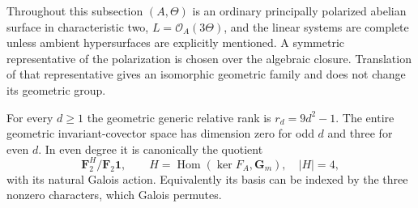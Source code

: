 Throughout this subsection $(A,\Theta)$ is an ordinary principally polarized
abelian surface in characteristic two, $L=\mathcal O_A(3\Theta)$, and the
linear systems are complete unless ambient hypersurfaces are explicitly
mentioned. A symmetric representative of the polarization is chosen over the
algebraic closure. Translation of that representative gives an isomorphic
geometric family and does not change its geometric group.

\begin{proposition}
\label{prop:ordinary-ppav-all-covectors}
For every $d\ge1$ the geometric generic relative rank is $r_d=9d^2-1$.
The entire geometric invariant-covector space has dimension zero for odd $d$
and three for even $d$. In even degree it is canonically the quotient
\[
 \mathbf F_2^{H}/\mathbf F_2\mathbf 1,
 \qquad H=\operatorname{Hom}(\ker F_A,\mathbf G_m),\quad |H|=4,
\]
with its natural Galois action. Equivalently its basis can be indexed by the
three nonzero characters, which Galois permutes.
\end{proposition}
